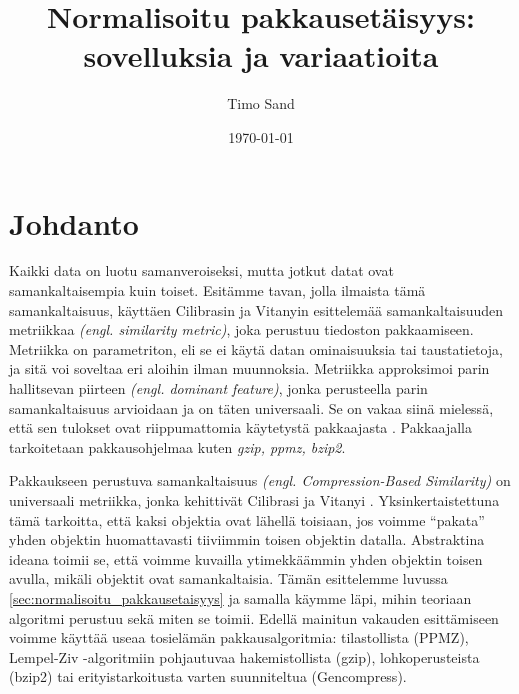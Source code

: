 \documentclass[12pt,finnish]{tktltiki2}
\title{Normalisoitu pakkausetäisyys: sovelluksia ja variaatioita}
\author{Timo Sand}
\date{\today}
\theoremstyle{definition}
\theoremstyle{remark}
\newcommand{\engl}[1]{\emph{(engl. #1)}}
\begin{document}

\frontmatter      %

\maketitle        %
\makeabstract     %

\tableofcontents  %


\mainmatter       %

\section{Johdanto} %
\label{sec:johdanto}
\label{par:intro-1}
  Kaikki data on luotu samanveroiseksi, mutta jotkut datat ovat samankaltaisempia kuin toiset.
  Esitämme tavan, jolla ilmaista tämä samankaltaisuus, käyttäen Cilibrasin ja Vitanyin esittelemää samankaltaisuuden metriikkaa \engl{similarity metric}, joka perustuu tiedoston pakkaamiseen. \cite{CV05}
  Metriikka on parametriton, eli se ei käytä datan ominaisuuksia tai taustatietoja, ja sitä voi soveltaa eri aloihin ilman muunnoksia.
  Metriikka approksimoi parin hallitsevan piirteen \engl{dominant feature}, jonka perusteella parin samankaltaisuus arvioidaan ja on täten universaali.
  Se on vakaa siinä mielessä, että sen tulokset ovat riippumattomia käytetystä pakkaajasta \cite{CV05}. Pakkaajalla tarkoitetaan pakkausohjelmaa kuten \emph{gzip, ppmz, bzip2}.

  \label{par:intro-2}
  Pakkaukseen perustuva samankaltaisuus \engl{Compression-Based Similarity} on universaali metriikka, jonka kehittivät Cilibrasi ja Vitanyi \cite{CV05}.
  Yksinkertaistettuna tämä tarkoitta, että kaksi objektia ovat lähellä toisiaan, jos voimme ``pakata'' yhden objektin huomattavasti tiiviimmin toisen objektin datalla.
  Abstraktina ideana toimii se, että voimme kuvailla ytimekkäämmin yhden objektin toisen avulla, mikäli objektit ovat samankaltaisia.
  Tämän esittelemme luvussa \ref{sec:normalisoitu_pakkausetaisyys} ja samalla käymme läpi, mihin teoriaan algoritmi perustuu sekä miten se toimii.
  Edellä mainitun vakauden esittämiseen voimme käyttää useaa tosielämän pakkausalgoritmia: tilastollista (PPMZ), Lempel-Ziv -algoritmiin pohjautuvaa hakemistollista (gzip), lohkoperusteista (bzip2) tai erityistarkoitusta varten suunniteltua (Gencompress).
\end{document}
